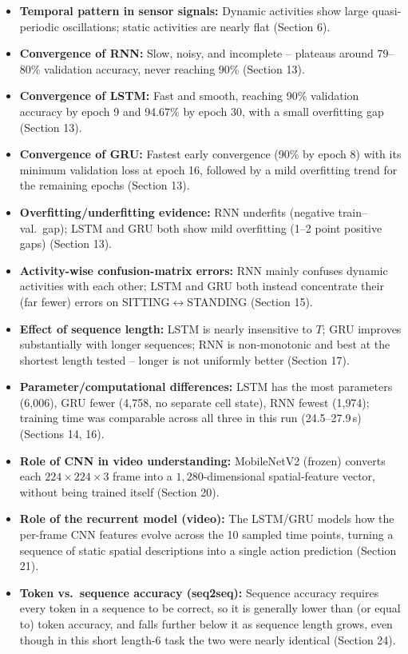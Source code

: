 \documentclass[10pt]{article}
\begin{document}
\begin{itemize}
\item \textbf{Temporal pattern in sensor signals:} Dynamic activities show
large quasi-periodic oscillations; static activities are nearly flat
(Section 6).
\item \textbf{Convergence of RNN:} Slow, noisy, and incomplete -- plateaus
around 79--80\% validation accuracy, never reaching 90\% (Section 13).
\item \textbf{Convergence of LSTM:} Fast and smooth, reaching 90\%
validation accuracy by epoch 9 and 94.67\% by epoch 30, with a small
overfitting gap (Section 13).
\item \textbf{Convergence of GRU:} Fastest early convergence (90\% by
epoch 8) with its minimum validation loss at epoch 16, followed by a mild
overfitting trend for the remaining epochs (Section 13).
\item \textbf{Overfitting/underfitting evidence:} RNN underfits (negative
train--val.\ gap); LSTM and GRU both show mild overfitting (1--2 point
positive gaps) (Section 13).
\item \textbf{Activity-wise confusion-matrix errors:} RNN mainly confuses
dynamic activities with each other; LSTM and GRU both instead concentrate
their (far fewer) errors on SITTING$\leftrightarrow$STANDING (Section 15).
\item \textbf{Effect of sequence length:} LSTM is nearly insensitive to $T$;
GRU improves substantially with longer sequences; RNN is non-monotonic and
best at the shortest length tested -- longer is not uniformly better
(Section 17).
\item \textbf{Parameter/computational differences:} LSTM has the most
parameters (6{,}006), GRU fewer (4{,}758, no separate cell state), RNN
fewest (1{,}974); training time was comparable across all three in this run
(24.5--27.9\,s) (Sections 14, 16).
\item \textbf{Role of CNN in video understanding:} MobileNetV2 (frozen)
converts each $224\times224\times3$ frame into a $1{,}280$-dimensional
spatial-feature vector, without being trained itself (Section 20).
\item \textbf{Role of the recurrent model (video):} The LSTM/GRU models how
the per-frame CNN features evolve across the 10 sampled time points,
turning a sequence of static spatial descriptions into a single action
prediction (Section 21).
\item \textbf{Token vs.\ sequence accuracy (seq2seq):} Sequence accuracy
requires every token in a sequence to be correct, so it is generally lower
than (or equal to) token accuracy, and falls further below it as sequence
length grows, even though in this short length-6 task the two were nearly
identical (Section 24).
\end{itemize}
\end{document}
